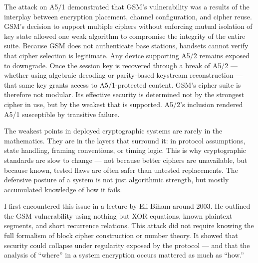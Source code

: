 The attack on A5/1 demonstrated that GSM’s vulnerability was a results of the interplay between encryption placement, channel configuration, and cipher reuse. GSM’s decision to support multiple ciphers without enforcing mutual isolation of key state allowed one weak algorithm to compromise the integrity of the entire suite. Because GSM does not authenticate base stations, handsets cannot verify that cipher selection is legitimate. Any device supporting A5/2 remains exposed to downgrade. Once the session key is recovered through a break of A5/2 — whether using algebraic decoding or parity-based keystream reconstruction — that same key grants access to A5/1-protected content. GSM’s cipher suite is therefore not modular. Its effective security is determined not by the strongest cipher in use, but by the weakest that is supported. A5/2’s inclusion rendered A5/1 susceptible by transitive failure.
\newpage
\begin{commentary}

The weakest points in deployed cryptographic systems are rarely in the mathematics. They are in the layers that surround it: in protocol assumptions, state handling, framing conventions, or timing logic. This is why cryptographic standards are slow to change — not because better ciphers are unavailable, but because known, tested flaws are often safer than untested replacements. The defensive posture of a system is not just algorithmic strength, but mostly accumulated knowledge of how it fails.

I first encountered this issue in a lecture by Eli Biham around 2003. He outlined the GSM vulnerability using nothing but XOR equations, known plaintext segments, and short recurrence relations. This attack did not require knowing the full formalism of block cipher construction or number theory. It showed that security could collapse under regularity exposed by the protocol — and that the analysis of “where” in a system encryption occurs mattered as much as “how.”

\end{commentary}